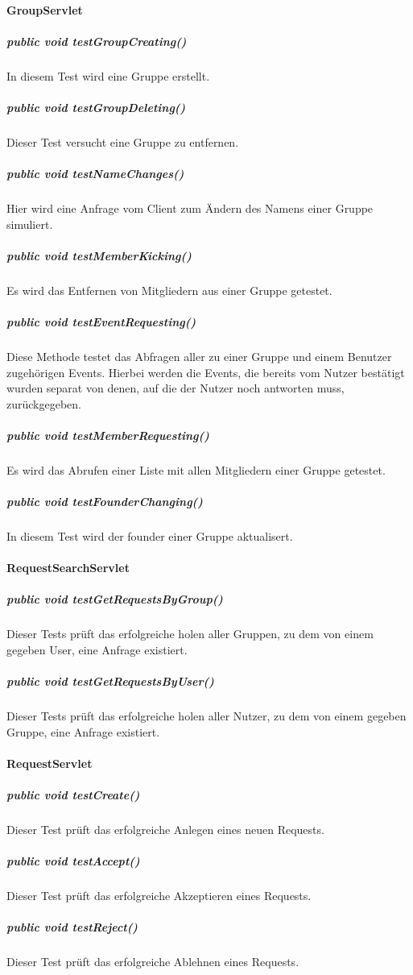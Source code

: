 \documentclass{scrartcl}
\begin{document}
	\paragraph{GroupServlet}
	\subparagraph{public void testGroupCreating()}
	In diesem Test wird eine Gruppe erstellt.
	\subparagraph{public void testGroupDeleting()}
	Dieser Test versucht eine Gruppe zu entfernen.
	\subparagraph{public void testNameChanges()}
	Hier wird eine Anfrage vom Client zum Ändern des Namens einer Gruppe simuliert.
	\subparagraph{public void testMemberKicking()}
	Es wird das Entfernen von Mitgliedern aus einer Gruppe getestet.
	\subparagraph{public void testEventRequesting()}
	Diese Methode testet das Abfragen aller zu einer Gruppe und einem Benutzer zugehörigen Events. Hierbei werden die Events, die bereits vom Nutzer bestätigt wurden separat von denen, auf die der Nutzer noch antworten muss, zurückgegeben.
	\subparagraph{public void testMemberRequesting()}
	Es wird das Abrufen einer Liste mit allen Mitgliedern einer Gruppe getestet.
	\subparagraph{public void testFounderChanging()}
	In diesem Test wird der founder einer Gruppe aktualisert.
	\paragraph{RequestSearchServlet}
	\subparagraph{public void testGetRequestsByGroup()}
	Dieser Tests prüft das erfolgreiche holen aller Gruppen, zu dem von einem gegeben User, eine Anfrage existiert.
	\subparagraph{public void testGetRequestsByUser()}
	Dieser Tests prüft das erfolgreiche holen aller Nutzer, zu dem von einem gegeben Gruppe, eine Anfrage existiert.
	\paragraph{RequestServlet}
	\subparagraph{public void testCreate()}
	Dieser Test prüft das erfolgreiche Anlegen eines neuen Requests.
	\subparagraph{public void testAccept()}
	Dieser Test prüft das erfolgreiche Akzeptieren eines Requests.
	\subparagraph{public void testReject()}
	Dieser Test prüft das erfolgreiche Ablehnen eines Requests.
\end{document}
